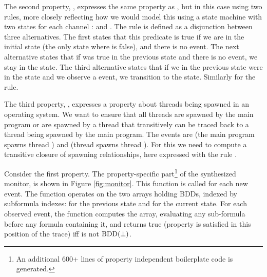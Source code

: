 The second property, , expresses the same 
property as , but in this case using two 
rules, more closely reflecting how we would model this using a state machine with two states for each channel : 
 and . The rule  is defined as a disjunction between three alternatives. The first states that this predicate is true if we are in the initial state 
(the only state where  is false), and there is no  event. The next alternative states that
if  was true in the previous state and there is
no  event, we stay in the  state.
The third alternative states that if we in the previous state were
in the  state and we observe a  event, we transition to the  state. Similarly for the  rule.

The third property, , expresses a property
about threads being spawned in an operating system. We want to 
ensure that all threads are spawned by the main program or are spawned by a thread that transitively can be traced back to a thread being spawned by the main program. The events are
 (the main program spawns thread ) and
 (thread  spawns thread ).
For this we need to compute a transitive closure of spawning relationships, here expressed with the rule .

%
Consider the first  property. The property-specific 
part\footnote{An additional 600+ lines of property independent 
boilerplate code is generated.} of the synthesized monitor, is shown 
in Figure \ref{fig:monitor}. This function is called for each new event. The function operates on the two arrays holding BDDs, indexed by subformula indexes:  for the previous state and  for the current state. For each observed event, the function  computes the  array, evaluating any sub-formula before any formula containing it,
and returns true (property is satisfied in this position of the trace)  iff  is not $\mathrm{BDD}(\bot)$. 

